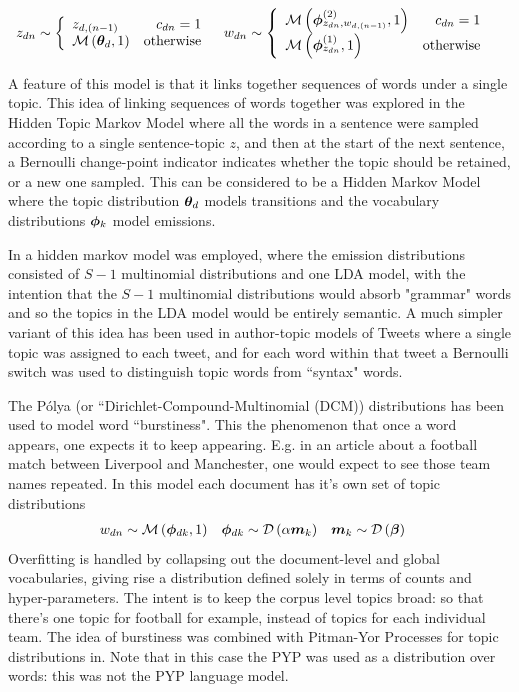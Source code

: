 \begin{align}
z_{dn} & \sim \left\{
    \begin{array}{lr}
        z_{d,(n-1)} & c_{dn} = 1 \\
        \mathcal{M} \left( {{ \bm \theta_d }},{1} \right) & \text{otherwise}
    \end{array}
\right.
& 
w_{dn} & \sim \left\{
    \begin{array}{lr}
        \mathcal{M} \left( {\bm \phi_{z_{dn},w_{d,(n-1)}}^{(2)}},{1} \right) & c_{dn} = 1 \\
        \mathcal{M} \left( {\bm \phi_{z_{dn}}^{(1)}},{1} \right) & \text{otherwise}
    \end{array}
\right.
\end{align}

A feature of this model is that it links together sequences of words under a single topic. This idea of linking sequences of words together was explored in the Hidden Topic Markov Model\cite{Gruber2007} where all the words in a sentence were sampled according to a single sentence-topic $z$, and then at the start of the next sentence, a Bernoulli change-point indicator indicates whether the topic should be retained, or a new one sampled. This can be considered to be a Hidden Markov Model where the topic distribution ${ \bm \theta_d }$ models transitions and the vocabulary distributions $\bm \phi_k$ model emissions. 

In \cite{Griffiths2005} a hidden markov model was employed, where the emission distributions consisted of $S-1$ multinomial distributions and one LDA model, with the intention that the $S-1$ multinomial distributions would absorb "grammar" words and so the topics in the LDA model would be entirely semantic. A much simpler variant of this idea has been used in author-topic models of Tweets\cite{Zhao2011}\cite{Zhao2011a} where a single topic was assigned to each tweet, and for each word within that tweet a Bernoulli switch was used to distinguish topic words from ``syntax" words.

The P\'olya (or ``Dirichlet-Compound-Multinomial (DCM)) distributions has been used to model word ``burstiness"\cite{Madsen2005}. This the phenomenon that once a word appears, one expects it to keep appearing. E.g. in an article about a football match between Liverpool and Manchester, one would expect to see those team names repeated. In this model each document has it's own set of topic distributions
\begin{align}
w_{dn} & \sim \mathcal{M} \left( {\bm \phi_{dk}},{1} \right) &
\bm \phi_{dk} & \sim \mathcal{D} \left( {\alpha \bm m_k} \right) &
\bm m_k & \sim \mathcal{D} \left( {\bm \beta} \right)
\end{align}
Overfitting is handled by collapsing out the document-level and global vocabularies, giving rise a distribution defined solely in terms of counts and hyper-parameters. The intent is to keep the corpus level topics broad: so that there's one topic for football for example, instead of topics for each individual team. The idea of burstiness was combined with Pitman-Yor Processes for topic distributions in\cite{Buntine2014}. Note that in this case the PYP was used as a distribution over words: this was not the PYP language model.


